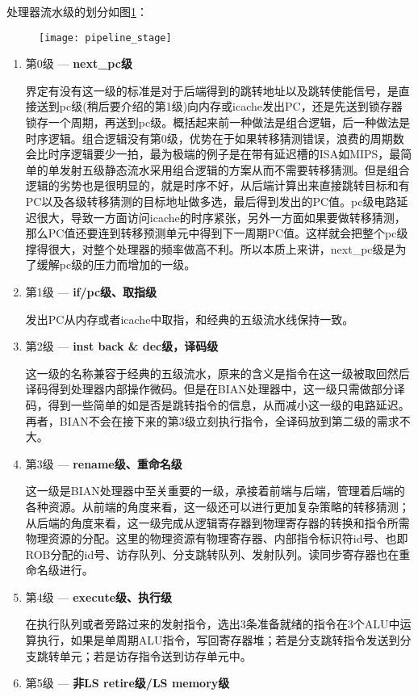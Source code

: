 处理器流水级的划分如图\ref{fig:my_pipeline}：
\begin{figure}[!htbp]
	\texttt{[image: pipeline\_stage]}
	\label{fig:my_pipeline}
\end{figure}
\begin{enumerate}[label=(\alph*)]
	\item 第0级 --- \textbf{next\_pc级}
	
	界定有没有这一级的标准是对于后端得到的跳转地址以及跳转使能信号，是直接送到pc级(稍后要介绍的第1级)向内存或icache发出PC，还是先送到锁存器锁存一个周期，再送到pc级。概括起来前一种做法是组合逻辑，后一种做法是时序逻辑。组合逻辑没有第0级，优势在于如果转移猜测错误，浪费的周期数会比时序逻辑要少一拍，最为极端的例子是在带有延迟槽的ISA如MIPS，最简单的单发射五级静态流水采用组合逻辑的方案从而不需要转移猜测。但是组合逻辑的劣势也是很明显的，就是时序不好，从后端计算出来直接跳转目标和有PC以及各级转移猜测的目标地址做多选，最后得到发出的PC值。pc级电路延迟很大，导致一方面访问icache的时序紧张，另外一方面如果要做转移猜测，那么PC值还要连到转移预测单元中得到下一周期PC值。这样就会把整个pc级撑得很大，对整个处理器的频率做高不利。所以本质上来讲，next\_pc级是为了缓解pc级的压力而增加的一级。
	\item 第1级 --- \textbf{if/pc级、取指级}
	
	发出PC从内存或者icache中取指，和经典的五级流水线保持一致。
	\item 第2级 --- \textbf{inst back \& dec级，译码级}
	
	这一级的名称兼容于经典的五级流水，原来的含义是指令在这一级被取回然后译码得到处理器内部操作微码。但是在BIAN处理器中，这一级只需做部分译码，得到一些简单的如是否是跳转指令的信息，从而减小这一级的电路延迟。再者，BIAN不会在接下来的第3级立刻执行指令，全译码放到第二级的需求不大。
	\item 第3级 --- \textbf{rename级、重命名级}
	
	这一级是BIAN处理器中至关重要的一级，承接着前端与后端，管理着后端的各种资源。从前端的角度来看，这一级还可以进行更加复杂策略的转移猜测；从后端的角度来看，这一级完成从逻辑寄存器到物理寄存器的转换和指令所需物理资源的分配。这里的物理资源有物理寄存器、内部指令标识符id号、也即ROB分配的id号、访存队列、分支跳转队列、发射队列。读同步寄存器也在重命名级进行。
	\item 第4级 --- \textbf{execute级、执行级}
	
	在执行队列或者旁路过来的发射指令，选出3条准备就绪的指令在3个ALU中运算执行，如果是单周期ALU指令，写回寄存器堆；若是分支跳转指令发送到分支跳转单元；若是访存指令送到访存单元中。
	\item 第5级 --- \textbf{非LS retire级/LS memory级}


\end{enumerate}
